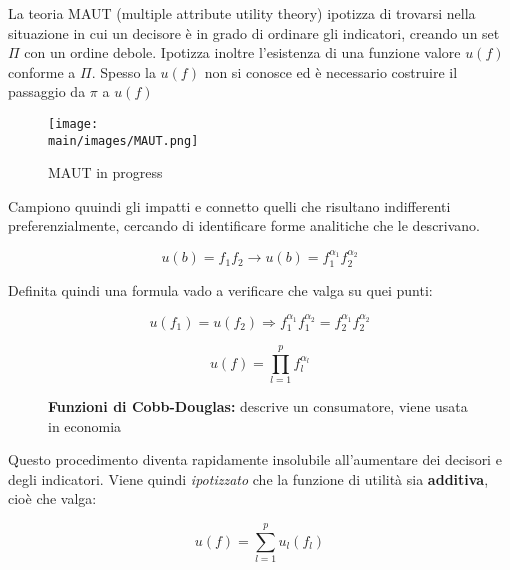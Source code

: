 \documentclass[\main/main.tex]{subfiles}
\begin{document}
La teoria MAUT (multiple attribute utility theory) ipotizza di trovarsi nella situazione in cui un decisore è in grado di ordinare gli indicatori, creando un set $\Pi$ con un ordine debole. Ipotizza inoltre l'esistenza di una funzione valore $u(f)$ conforme a $\Pi$. Spesso la $u(f)$ non si conosce ed è necessario costruire il passaggio da $\pi$ a $u(f)$

\begin{figure}[H]
  \centering
  \texttt{[image: \\main/images/MAUT.png]}
  \caption{MAUT in progress}
\end{figure}

Campiono quuindi gli impatti e connetto quelli che risultano indifferenti preferenzialmente, cercando di identificare forme analitiche che le descrivano.

\[
  u(b) = f_1f_2 \rightarrow u(b) = f_1^{\alpha_{1}}f_2^{\alpha_{2}}
\]

Definita quindi una formula vado a verificare che valga su quei punti:

\[
  u(f_1) = u(f_2) \Rightarrow  f_1^{\alpha_{1}}f_1^{\alpha_{2}} = f_2^{\alpha_{1}}f_2^{\alpha_{2}}
\]

\begin{figure}[H]
  \[
    u(f) = \prod_{l=1}^p f_l^{\alpha_l}
  \]
  \caption{\textbf{Funzioni di Cobb-Douglas:} descrive un consumatore, viene usata in economia}
\end{figure}

Questo procedimento diventa rapidamente insolubile all'aumentare dei decisori e degli indicatori. Viene quindi \textit{ipotizzato} che la funzione di utilità sia \textbf{additiva}, cioè che valga:

\[
  u(f) = \sum_{l=1}^p u_l(f_l)
\]
\end{document}

